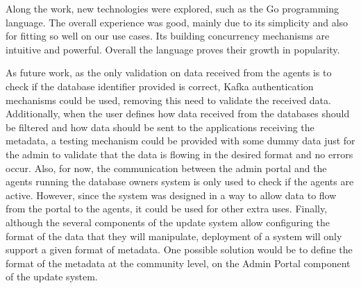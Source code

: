 Along the work, new technologies were explored, such as the Go programming language.
The overall experience was good, mainly due to its simplicity and also for fitting so well on our use cases.
Its building concurrency mechanisms are intuitive and powerful.
Overall the language proves their growth in popularity.

As future work, as the only validation on data received from the agents is to check if the database identifier provided is correct, Kafka authentication mechanisms could be used, removing this need to validate the received data.
Additionally, when the user defines how data received from the databases should be filtered and how data should be sent to the applications receiving the metadata, a testing mechanism could be provided with some dummy data just for the admin to validate that the data is flowing in the desired format and no errors occur.
Also, for now, the communication between the admin portal and the agents running the database owners system is only used to check if the agents are active.
However, since the system was designed in a way to allow data to flow from the portal to the agents, it could be used for other extra uses.
Finally, although the several components of the update system allow configuring the format of the data that they will manipulate, deployment of a system will only support a given format of metadata.
One possible solution would be to define the format of the metadata at the community level, on the Admin Portal component of the update system.
